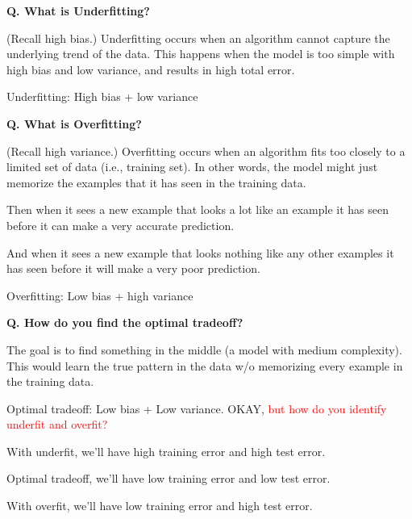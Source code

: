 \begin{frame}[fragile]{\textbf{Q. What is Underfitting?}}
  \begin{wideitemize}
    \item (Recall high bias.) Underfitting occurs when an algorithm
    cannot capture the underlying trend of the data. This happens
    when the model is too simple with high bias and low variance, and
    results in high total error.
    \item Underfitting: High bias + low variance
  \end{wideitemize}
\end{frame}

\begin{frame}[fragile]{\textbf{Q. What is Overfitting?}}
  \begin{wideitemize}
    \item (Recall high variance.) Overfitting occurs when an algorithm
    fits too closely to a limited set of data (i.e., training set). In other
    words, the model might just memorize the examples that it has seen in
    the training data.
    \begin{wideitemize}
      \item Then when it sees a new example that looks a lot like an
      example it has seen before it can make a very accurate prediction.
      \item And when it sees a new example that looks nothing like any
      other examples it has seen before it will make a very poor prediction.
    \end{wideitemize}
    \item Overfitting: Low bias + high variance
  \end{wideitemize}
\end{frame}

\begin{frame}[fragile]{\textbf{Q. How do you find the optimal tradeoff?}}
  \begin{wideitemize}
    \item The goal is to find something in the middle (a model with medium
    complexity). This would learn the true pattern in the data w/o memorizing
    every example in the training data.
    \item Optimal tradeoff: Low bias + Low variance. OKAY, \textcolor{red}{but
    how do you identify underfit and overfit?}
    \begin{wideitemize}
      \item With underfit, we'll have high training error and high test error.
      \item Optimal tradeoff, we'll have low training error and low test error.
      \item With overfit, we'll have low training error and high test error.
    \end{wideitemize}
  \end{wideitemize}
\end{frame}

